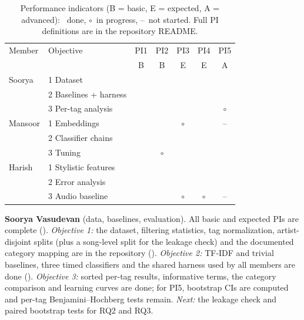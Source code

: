 \documentclass{article}
\newcommand{\done}{\checkmark}
\newcommand{\prog}{$\circ$}
\newcommand{\nost}{--}
\begin{document}
\begin{table}[t]
\centering\small
\setlength{\tabcolsep}{4pt}
\begin{tabular}{@{}llccccc@{}}
\toprule
Member & Objective & PI1 & PI2 & PI3 & PI4 & PI5 \\
 & & B & B & E & E & A \\
\midrule
Soorya & 1 Dataset & \done & \done & \done & \done & \done \\
       & 2 Baselines + harness & \done & \done & \done & \done & \done \\
       & 3 Per-tag analysis & \done & \done & \done & \done & \prog \\
\midrule
Mansoor & 1 Embeddings & \done & \done & \prog & \done & \nost \\
        & 2 Classifier chains & \done & \done & \done & \done & \done \\
        & 3 Tuning & \done & \prog & \done & \done & \done \\
\midrule
Harish & 1 Stylistic features & \done & \done & \done & \done & \done \\
       & 2 Error analysis & \done & \done & \done & \done & \done \\
       & 3 Audio baseline & \done & \done & \prog & \prog & \nost \\
\bottomrule
\end{tabular}
\caption{Performance indicators (B = basic, E = expected, A = advanced): \done\ done, \prog\ in progress, \nost\ not started. Full PI definitions are in the repository README.}
\label{tab:pis}
\end{table}

\textbf{Soorya Vasudevan} (data, baselines, evaluation). All basic and expected PIs are complete (). \emph{Objective 1:} the dataset, filtering statistics, tag normalization, artist-disjoint splits (plus a song-level split for the leakage check) and the documented category mapping are in the repository (). \emph{Objective 2:} TF-IDF and trivial baselines, three timed classifiers and the shared harness used by all members are done (). \emph{Objective 3:} sorted per-tag results, informative terms, the category comparison and learning curves are done; for PI5, bootstrap CIs are computed and per-tag Benjamini--Hochberg tests remain. \emph{Next:} the leakage check and paired bootstrap tests for RQ2 and RQ3.
\end{document}
